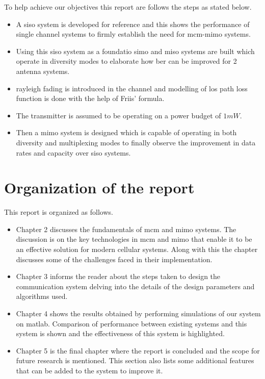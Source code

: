 To help achieve our objectives this report are follows the steps as stated below.

\begin{itemize}
\item A \acrshort{siso} system is developed for reference and this shows the performance of single channel systems to firmly establish the need for \acrshort{mcm}-\acrshort{mimo} systems.
\item Using this \acrshort{siso} system as a foundatio \acrshort{simo} and \acrshort{miso} systems are built which operate in diversity modes to elaborate how \acrshort{ber} can be improved for 2 antenna systems.
\item \gls{rayleigh fading} is introduced in the channel and modelling of \acrshort{los} path loss function is done with the help of Friis' formula.
\item The transmitter is assumed to be operating on a power budget of $1mW$.
\item Then a \acrshort{mimo} system is designed which is capable of operating in both diversity and multiplexing modes to finally observe the improvement in data rates and capacity over \acrshort{siso} systems.
\end{itemize}

\section{Organization of the report}

This report is organized as follows. 
\begin{itemize}
\item Chapter 2 discusses the fundamentals of \acrshort{mcm} and \acrshort{mimo} systems. The discussion is on the key technologies in \acrshort{mcm} and \acrshort{mimo} that enable it to be an effective solution for modern cellular systems. Along with this the chapter discusses some of the challenges faced in their implementation.
\item Chapter 3 informs the reader about the steps taken to design the communication system delving into the details of the design parameters and algorithms used. 
\item Chapter 4 shows the results obtained by performing simulations of our system on \gls{matlab}. Comparison of performance between existing systems and this system is shown and the effectiveness of this system is highlighted.
\item Chapter 5 is the final chapter where the report is concluded and the scope for future research is mentioned. This section also lists some additional features that can be added to the system to improve it. 
\end{itemize}

